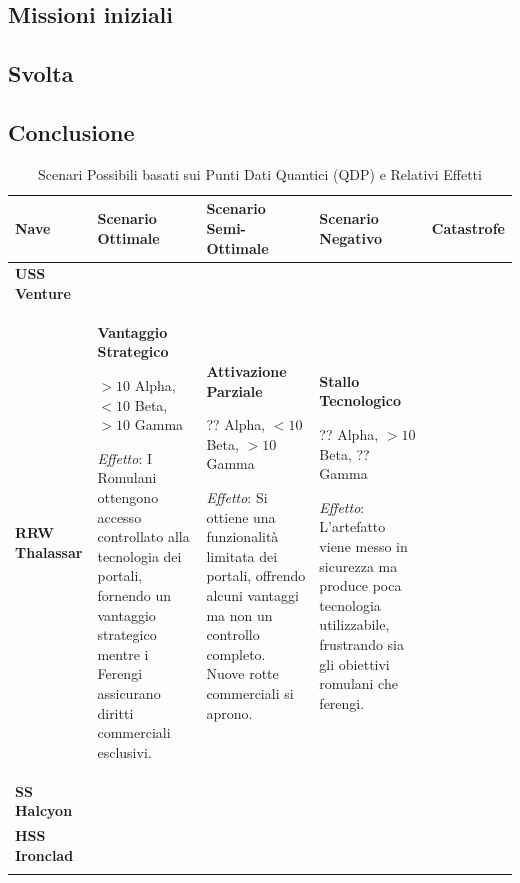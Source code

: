 \documentclass[letterpaper,twocolumn,openany,nodeprecatedcode]{dndbook}
\begin{document}
\subsection{Missioni iniziali}
\subsection{Svolta}
\subsection{Conclusione}


\begin{landscape}

\begin{table}[htbp]
\centering
\caption{Scenari Possibili basati sui Punti Dati Quantici (QDP) e Relativi Effetti}
\small
\begin{tabular}{|p{2.3cm}|p{4cm}|p{4cm}|p{4cm}|p{4cm}|}
\hline
\textbf{Nave} & \textbf{Scenario Ottimale} & \textbf{Scenario Semi-Ottimale} & \textbf{Scenario Negativo} & \textbf{Catastrofe} \\ 
\hline
\textbf{USS Venture} & 

& 

& 

& 

\\ 
\hline
\textbf{RRW Thalassar} & 
\textbf{Vantaggio Strategico}

$>10$ Alpha, $<10$ Beta, $>10$ Gamma

\textit{Effetto}: I Romulani ottengono accesso controllato alla tecnologia dei portali, fornendo un vantaggio strategico mentre i Ferengi assicurano diritti commerciali esclusivi.
& 
\textbf{Attivazione Parziale}

?? Alpha, $<10$ Beta, $>10$ Gamma

\textit{Effetto}: Si ottiene una funzionalità limitata dei portali, offrendo alcuni vantaggi ma non un controllo completo. Nuove rotte commerciali si aprono.
& 
\textbf{Stallo Tecnologico}

?? Alpha, $>10$ Beta, ?? Gamma

\textit{Effetto}: L'artefatto viene messo in sicurezza ma produce poca tecnologia utilizzabile, frustrando sia gli obiettivi romulani che ferengi.
& 

\\ 
\hline
\textbf{SS Halcyon} & 

& 

& 

& 

\\ 
\hline
\textbf{HSS Ironclad} & 

& 

& 

& 

\\ 
\hline
\multicolumn{5}{|p{18.3cm}|}{} \\
\hline
\end{tabular}
\end{table}
\end{landscape}
\end{document}
